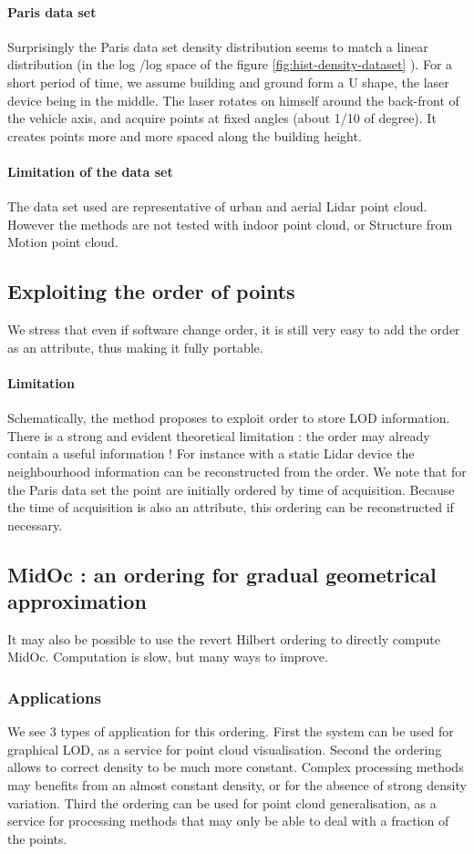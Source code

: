 		 \paragraph{Paris data set}
			 Surprisingly the Paris data set density distribution seems to match a linear distribution (in the log /log space of the figure \ref{fig:hist-density-dataset} ).
			 For a short period of time, we assume building and ground form a U shape, the laser device being in the middle. The laser rotates on himself around the back-front of the vehicle axis, and acquire points at fixed angles (about 1/10 of degree). It creates points more and more spaced along the building height.
			 
		 \paragraph{Limitation of the data set}
			 The data set used are representative of urban and aerial Lidar point cloud. However the methods are not tested with indoor point cloud, or Structure from Motion point cloud.
		 
	 \subsection{Exploiting the order of points}
		 We stress that even if software change order, it is still very easy to add the order as an attribute, thus making it fully portable.
		 \paragraph{Limitation}
			 Schematically, the method proposes to exploit order to store LOD information. There is a strong and evident theoretical limitation : the order may already contain a useful information !
			 For instance with a static Lidar device the neighbourhood information can be reconstructed from the order. We note that for the Paris data set the point are initially ordered by time of acquisition. Because the time of acquisition is also an attribute, this ordering can be reconstructed if necessary.
			 
	 \subsection{MidOc : an ordering for gradual geometrical approximation}
	 	It may also be possible to use the revert Hilbert ordering to directly compute MidOc.
	 	Computation is slow, but many ways to improve.
	 	\subsubsection{Applications}
	 	We see 3 types of application for this ordering. First the system can be used for graphical LOD, as a service for point cloud visualisation. Second the ordering allows to correct density to be much more constant. Complex processing methods may benefits from an almost constant density, or for the absence of strong density variation. Third the ordering can be used for point cloud generalisation, as a service for processing methods that may only be able to deal with a fraction of the points.  
	 	
